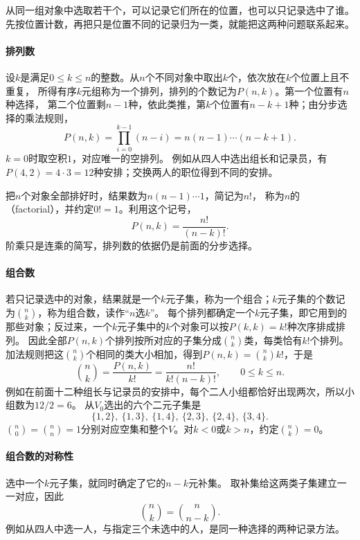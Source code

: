 从同一组对象中选取若干个，可以记录它们所在的位置，也可以只记录选中了谁。
先按位置计数，再把只是位置不同的记录归为一类，就能把这两种问题联系起来。

\paragraph{排列数}
设$k$是满足$0\leq k\leq n$的整数。从$n$个不同对象中取出$k$个，依次放在$k$个位置上且不重复，
所得有序$k$元组称为一个排列，排列的个数记为$P(n,k)$。第一个位置有$n$种选择，
第二个位置剩$n-1$种，依此类推，第$k$个位置有$n-k+1$种；由分步选择的乘法规则，
\[
 P(n,k)=\prod_{i=0}^{k-1}(n-i)=n(n-1)\cdots(n-k+1).
\]
$k=0$时取空积$1$，对应唯一的空排列。
例如从四人中选出组长和记录员，有$P(4,2)=4\cdot3=12$种安排；交换两人的职位得到不同的安排。

把$n$个对象全部排好时，结果数为$n(n-1)\cdots1$，简记为$n!$，
称为$n$的（factorial），并约定$0!=1$。利用这个记号，
\[
 P(n,k)=\frac{n!}{(n-k)!}.
\]
阶乘只是连乘的简写，排列数的依据仍是前面的分步选择。

\paragraph{组合数}
若只记录选中的对象，结果就是一个$k$元子集，称为一个组合；$k$元子集的个数记为$\binom nk$，称为组合数，读作“$n$选$k$”。
每个排列都确定一个$k$元子集，即它用到的那些对象；反过来，一个$k$元子集中的$k$个对象可以按$P(k,k)=k!$种次序排成排列。
因此全部$P(n,k)$个排列按所对应的子集分成$\binom nk$类，每类恰有$k!$个排列。
加法规则把这$\binom nk$个相同的类大小相加，得到$P(n,k)=\binom nk k!$，于是
\begin{equation}
 \binom nk
 =\frac{P(n,k)}{k!}
 =\frac{n!}{k!(n-k)!},
 \qquad 0\leq k\leq n.
 \label{eq:prelim-binomial-coefficient}
\end{equation}
例如在前面十二种组长与记录员的安排中，每个二人小组都恰好出现两次，所以小组数为$12/2=6$。
从$V_0$选出的六个二元子集是
\[
 \{1,2\},\ \{1,3\},\ \{1,4\},\ \{2,3\},\ \{2,4\},\ \{3,4\}.
\]
$\binom n0=\binom nn=1$分别对应空集和整个$V$。对$k<0$或$k>n$，约定$\binom nk=0$。

\paragraph{组合数的对称性}
选中一个$k$元子集，就同时确定了它的$n-k$元补集。
取补集给这两类子集建立一一对应，因此
\[
 \binom nk=\binom n{n-k}.
\]
例如从四人中选一人，与指定三个未选中的人，是同一种选择的两种记录方法。

